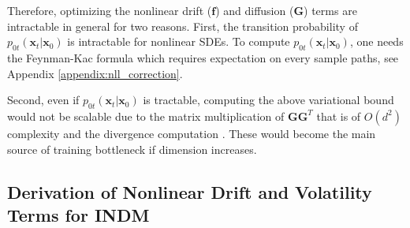 \documentclass{article}
\theoremstyle{definition}
\theoremstyle{remark}
\begin{document}
	Therefore, optimizing the nonlinear drift ($\mathbf{f}$) and diffusion ($\mathbf{G}$) terms are intractable in general for two reasons. First, the transition probability of $p_{0t}(\mathbf{x}_{t}\vert\mathbf{x}_{0})$ is intractable for nonlinear SDEs. To compute $p_{0t}(\mathbf{x}_{t}\vert\mathbf{x}_{0})$, one needs the Feynman-Kac formula \cite{huang2021variational} which requires expectation on every sample paths, see Appendix \ref{appendix:nll_correction}.
	
	Second, even if $p_{0t}(\mathbf{x}_{t}\vert\mathbf{x}_{0})$ is tractable, computing the above variational bound would not be scalable due to the matrix multiplication of $\mathbf{G}\mathbf{G}^{T}$ that is of $O(d^{2})$ complexity and the divergence computation \cite{avron2011randomized}. These would become the main source of training bottleneck if dimension increases.
	
	\subsection{Derivation of Nonlinear Drift and Volatility Terms for INDM}\label{appendix:derivation_of_diffusion}
	
\end{document}
